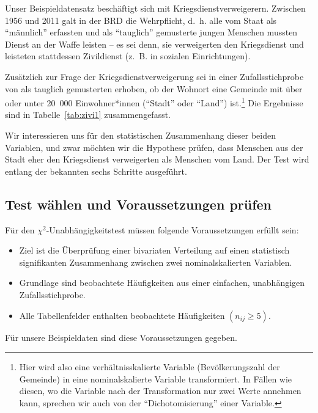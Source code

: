 \documentclass[
  11pt,
  ngerman,
  a4paper,
]{report}
\providecommand{\tightlist}{%
  \setlength{\itemsep}{0pt}\setlength{\parskip}{0pt}}
\begin{document}
Unser Beispieldatensatz beschäftigt sich mit Kriegsdienstverweigerern. Zwischen 1956 und 2011 galt in der BRD die Wehrpflicht, d.~h. alle vom Staat als \enquote{männlich} erfassten und als \enquote{tauglich} gemusterte jungen Menschen mussten Dienst an der Waffe leisten -- es sei denn, sie verweigerten den Kriegsdienst und leisteten stattdessen Zivildienst (z.~B. in sozialen Einrichtungen).

Zusätzlich zur Frage der Kriegsdienstverweigerung sei in einer Zufallsstichprobe von als tauglich gemusterten erhoben, ob der Wohnort eine Gemeinde mit über oder unter 20~000 Einwohner*innen (\enquote{Stadt} oder \enquote{Land}) ist.\footnote{Hier wird also eine verhältnisskalierte Variable (Bevölkerungszahl der Gemeinde) in eine nominalskalierte Variable transformiert. In Fällen wie diesen, wo die Variable nach der Transformation nur zwei Werte annehmen kann, sprechen wir auch von der \enquote{Dichotomisierung} einer Variable.} Die Ergebnisse sind in Tabelle~\ref{tab:zivi1} zusammengefasst.

Wir interessieren uns für den statistischen Zusammenhang dieser beiden Variablen, und zwar möchten wir die Hypothese prüfen, dass Menschen aus der Stadt eher den Kriegsdienst verweigerten als Menschen vom Land. Der Test wird entlang der bekannten sechs Schritte ausgeführt.

\hypertarget{test-wuxe4hlen-und-voraussetzungen-pruxfcfen-4}{%
\subsection{Test wählen und Voraussetzungen prüfen}\label{test-wuxe4hlen-und-voraussetzungen-pruxfcfen-4}}

Für den \(\chi^2\)-Unabhängigkeitstest müssen folgende Voraussetzungen erfüllt sein:

\begin{itemize}
\tightlist
\item
  Ziel ist die Überprüfung einer bivariaten Verteilung auf einen statistisch signifikanten Zusammenhang zwischen zwei nominalskalierten Variablen.
\item
  Grundlage sind beobachtete Häufigkeiten aus einer einfachen, unabhängigen Zufallsstichprobe.
\item
  Alle Tabellenfelder enthalten beobachtete Häufigkeiten \((n_{ij}\geq 5)\).
\end{itemize}

Für unsere Beispieldaten sind diese Voraussetzungen gegeben.
\end{document}
